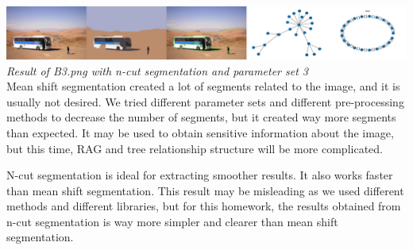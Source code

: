 \documentclass[conference]{IEEEtran}
\begin{document}
\includegraphics[width=0.9\linewidth]{B3_algorithm_ncut_parameterset_3.png}
\\
\textit{Result of B3.png with n-cut segmentation and parameter set 3}\\

Mean shift segmentation created a lot of segments related to the image, and it is usually not desired. We tried different parameter sets and different pre-processing methods to decrease the number of segments, but it created way more segments than expected. It may be used to obtain sensitive information about the image, but this time, RAG and tree relationship structure will be more complicated.

N-cut segmentation is ideal for extracting smoother results. It also works faster than mean shift segmentation. This result may be misleading as we used different methods and different libraries, but for this homework, the results obtained from n-cut segmentation is way more simpler and clearer than mean shift segmentation. 
\end{document}
